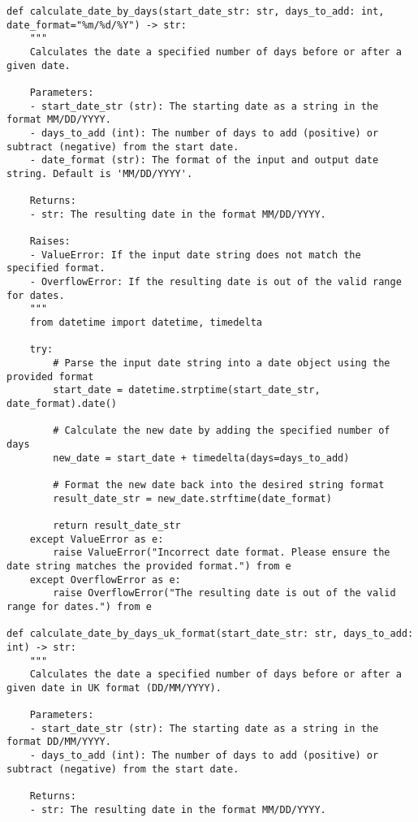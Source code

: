 \begin{tcolorbox}[title=Tools for Date, width=\textwidth,top=0mm, breakable]
\begin{Verbatim}[breaklines=true, breakanywhere=true, fontsize=\footnotesize]
def calculate_date_by_days(start_date_str: str, days_to_add: int, date_format="%m/%d/%Y") -> str:
    """
    Calculates the date a specified number of days before or after a given date.

    Parameters:
    - start_date_str (str): The starting date as a string in the format MM/DD/YYYY.
    - days_to_add (int): The number of days to add (positive) or subtract (negative) from the start date.
    - date_format (str): The format of the input and output date string. Default is 'MM/DD/YYYY'.

    Returns:
    - str: The resulting date in the format MM/DD/YYYY.
    
    Raises:
    - ValueError: If the input date string does not match the specified format.
    - OverflowError: If the resulting date is out of the valid range for dates.
    """
    from datetime import datetime, timedelta

    try:
        # Parse the input date string into a date object using the provided format
        start_date = datetime.strptime(start_date_str, date_format).date()

        # Calculate the new date by adding the specified number of days
        new_date = start_date + timedelta(days=days_to_add)

        # Format the new date back into the desired string format
        result_date_str = new_date.strftime(date_format)

        return result_date_str
    except ValueError as e:
        raise ValueError("Incorrect date format. Please ensure the date string matches the provided format.") from e
    except OverflowError as e:
        raise OverflowError("The resulting date is out of the valid range for dates.") from e

def calculate_date_by_days_uk_format(start_date_str: str, days_to_add: int) -> str:
    """
    Calculates the date a specified number of days before or after a given date in UK format (DD/MM/YYYY).

    Parameters:
    - start_date_str (str): The starting date as a string in the format DD/MM/YYYY.
    - days_to_add (int): The number of days to add (positive) or subtract (negative) from the start date.

    Returns:
    - str: The resulting date in the format MM/DD/YYYY.
    

\end{Verbatim}
\end{tcolorbox}
